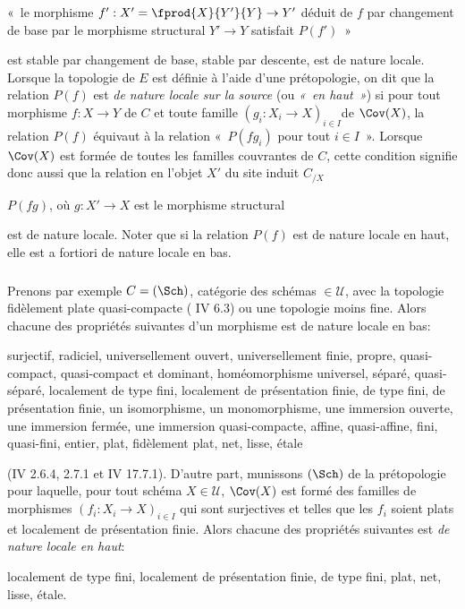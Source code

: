 \documentclass[10pt]{../fichiers-configuration-latex/smfart}
\begin{document}
« le morphisme $f':X'=\fprod{X}{Y'}{Y}\rightarrow Y'$ déduit de
$f$ par changement de base par le morphisme structural
$Y'\rightarrow Y$ satisfait $P(f')$ »

est stable par changement de base, \resp stable par descente, \resp
est de nature locale. Lorsque la topologie de $E$ est définie à
l'aide d'une prétopologie, on dit que la relation $P(f)$ est
\emph{de nature locale sur la source} (ou \emph{« en haut »}) si
pour tout morphisme $f:X\rightarrow Y$ de $C$ et toute famille
$(g_i:X_i\rightarrow X)_{i\in I}$\pageoriginale de $\Cov(X)$, la
relation $P(f)$ équivaut à la relation « $P(fg_i)$ pour tout $i\in
I$ ». Lorsque $\Cov(X)$ est formée de toutes les familles
couvrantes de $C$, cette condition signifie donc aussi que la
relation en l'objet $X'$ du site induit $C_{/X}$
\begin{center}
$P(fg)$, où $g:X'\rightarrow X$ est le morphisme structural
\end{center}
est de nature locale. Noter que si la relation $P(f)$ est de nature
locale en haut, elle est a fortiori de nature locale en bas.

\subsubsection{}
Prenons par exemple $C=(\Sch)$, catégorie des schémas $\in
𝒰$, avec la topologie fidèlement plate quasi-compacte ( IV 6.3) ou une topologie moins fine. Alors chacune des propriétés
suivantes d'un morphisme est de nature locale en bas:

surjectif, radiciel, universellement ouvert, universellement finie,
propre, quasi-compact, quasi-compact et dominant, homéomorphisme
universel, séparé, quasi-séparé, localement de type fini, localement
de présentation finie, de type fini, de présentation finie, un
isomorphisme, un monomorphisme, une immersion ouverte, une immersion
fermée, une immersion quasi-compacte, affine, quasi-affine, fini,
quasi-fini, entier, plat, fidèlement plat, net, lisse, étale

\noindent (\EGA IV 2.6.4, 2.7.1 et \EGA IV 17.7.1). D'autre part,
munissons $(\Sch)$ de la prétopologie pour laquelle, pour tout
schéma $X\in 𝒰$, $\Cov(X)$ est formé des familles de
morphismes $(f_i:X_i\rightarrow X)_{i\in I}$ qui sont surjectives et
telles que les $f_i$ soient plats et localement de présentation
finie. Alors chacune des propriétés suivantes est \emph{de nature
locale en haut}:

localement de type fini, localement de présentation finie, de type
fini, plat, net, lisse, étale.
\end{document}
